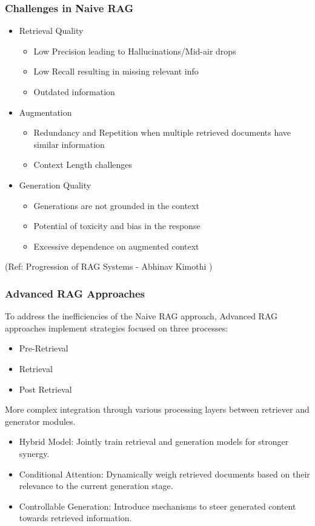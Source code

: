 \begin{frame}[fragile]\frametitle{Challenges in Naive RAG}

\begin{itemize}
\item Retrieval Quality
	\begin{itemize}
	\item Low Precision leading to Hallucinations/Mid-air drops
	\item Low  Recall  resulting in  missing  relevant info
	\item Outdated information
	\end{itemize}
\item Augmentation
	\begin{itemize}
	\item Redundancy and Repetition when multiple retrieved documents have similar information
	\item Context Length challenges
	\end{itemize}
\item Generation Quality
	\begin{itemize}
	\item Generations are not grounded in the context 
	\item Potential of toxicity and bias in the response
	\item Excessive dependence on augmented context
	\end{itemize}
\end{itemize}	


{\tiny (Ref: Progression of RAG Systems - Abhinav Kimothi )}

\end{frame}

\begin{frame}[fragile]\frametitle{Advanced RAG Approaches}

To  address  the  inefficiencies  of  the  Naive  RAG  approach,  Advanced  RAG
approaches implement strategies focused on three processes:
\begin{itemize}
\item Pre-Retrieval
\item Retrieval
\item Post Retrieval
\end{itemize}	

More complex integration through various processing layers between retriever and generator modules.

\begin{itemize}
\item Hybrid Model: Jointly train retrieval and generation models for stronger synergy.
\item Conditional Attention: Dynamically weigh retrieved documents based on their relevance to the current generation stage.
\item Controllable Generation: Introduce mechanisms to steer generated content towards retrieved information.
\end{itemize}	

\end{frame}


